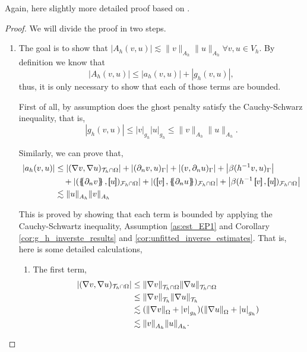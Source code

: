 Again, here  slightly more detailed proof based on \cite{gurkan2019stabilized}.
\begin{proof}
We will divide the proof in two steps.

    \begin{enumerate}[label=\arabic*)]
        \item
The goal is to show that $\left\lvert A_{h}( v,u) \right\rvert \lesssim \| v \|_{A_{h}  }^{  }     \| u \|_{A_{h}  }^{  }  \forall v,u \in V_{h} $.
            By definition we know that \[
    \left\lvert A_{h}( v,u) \right\rvert \le  \left\lvert a_{h}( v,u)  \right\rvert  + \left\lvert g_{h}( v,u)  \right\rvert,
    \]
    thus, it is only necessary to show that each of those terms are bounded.

         First of all, by assumption does the ghost penalty satisfy the Cauchy-Schwarz inequality, that is,  \[
\left\lvert g_{h}( v,u)  \right\rvert \le \left\lvert v \right\rvert _{g_{h}} \left\lvert u \right\rvert _{g_{h}} \le \| v \|_{ A_{h} }^{  } \| u \|_{ A_{h} }^{  }.
    \]

    Similarly, we can prove that,      \[
        \begin{split}
    \left\lvert a_{h}( v,u)  \right\rvert & \le  \left\lvert( \nabla v, \nabla u)_{\mathcal{T} _{h} \cap \Omega }  \right\rvert +  \left\lvert  ( \partial _{n} v,u)_{\Gamma } \right\rvert   + \left\lvert ( v, \partial _{n} u)_{\Gamma } \right\rvert  +
    \left\lvert\beta ( h^{-1} v,u)_{\Gamma }  \right\rvert  \\
    & \quad  + \left\lvert( \mean{ \partial _{n} v }  , \jump{ u }  ) _{\mathcal{F} _{h} \cap \Omega }  \right\rvert  + \left\lvert ( \jump{ v }  , \mean{ \partial _{n} u }  )_{\mathcal{F} _{h}\cap \Omega } \right\rvert  + \left\lvert \beta ( h^{-1} \jump{ v }  ,
    \jump{ u }  )_{\mathcal{F}_{h}\cap \Omega  } \right\rvert \\
     & \lesssim  \| u \|_{ A_{h} }^{  } \| v \|_{ A_{h} }^{  }
        \end{split}
    \]

This is proved by showing that each term is bounded by applying the Cauchy-Schwartz inequality, Assumption \ref{as:est_EP1} and Corollary \ref{cor:g_h_inverste_results} and \ref{cor:unfitted_inverse_estimates}. That is, here is some
    detailed calculations,
    \begin{enumerate}
        \item The first term, \[
\begin{split}
\left\lvert( \nabla v, \nabla u)_{\mathcal{T} _{h} \cap \Omega }  \right\rvert & \le \| \nabla v \|_{ \mathcal{T} _{h}\cap \Omega  }^{  }\| \nabla u \|_{ \mathcal{T} _{h} \cap \Omega  }^{  } \\
& \le \| \nabla v \|_{ \mathcal{T} _{h}  }^{  }\| \nabla u \|_{ \mathcal{T} _{h}   }^{  } \\
        & \lesssim   ( \| \nabla v \|_{ \Omega  }^{  } + \left\lvert  v  \right\rvert _{g_{h}} )( \| \nabla u \|_{ \Omega  }^{  } + \left\lvert  u  \right\rvert _{g_{h}} )\\
        &  \lesssim  \| v \|_{ A_{h} }^{  } \|u  \|_{ A_{h} }^{  }.
\end{split}
            \]


\end{enumerate}
\end{enumerate}
\end{proof}
